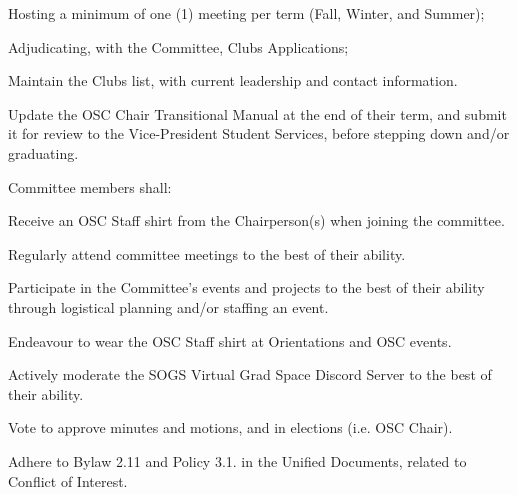 \begin{longenum}[ label*=\thesubsection.\arabic*., align=left]
\begin{longenum}[label*=\arabic*., align=left]
\begin{longenum}[label*=\arabic*., align=left]
\begin{longenum}[label*=\arabic*., align=left]
				\item Hosting a minimum of one (1) meeting per term (Fall, Winter, and Summer);
				\item Adjudicating, with the Committee, Clubs Applications; 
				\item Maintain the Clubs list, with current leadership and contact information.				
				\end{longenum}					
			\item Update the OSC Chair Transitional Manual at the end of their term, and submit it for review to the Vice-President Student Services, before stepping down and/or graduating.						
			\end{longenum}	
		\item Committee members shall:
			\begin{longenum}[label*=\arabic*., align=left]
			\item Receive an OSC Staff shirt from the Chairperson(s) when joining the committee.
			\item Regularly attend committee meetings to the best of their ability.
			\item Participate in the Committee's events and projects to the best of their ability through logistical planning and/or staffing an event.
			\item Endeavour to wear the OSC Staff shirt at Orientations and OSC events.
			\item Actively moderate the SOGS Virtual Grad Space Discord Server to the best of their ability.
			\item Vote to approve minutes and motions, and in elections (i.e. OSC Chair).			 			
			\item Adhere to Bylaw 2.11 and Policy 3.1. in the Unified Documents, related to Conflict of Interest.
			\end{longenum}	
		\end{longenum}
\end{longenum}
	
